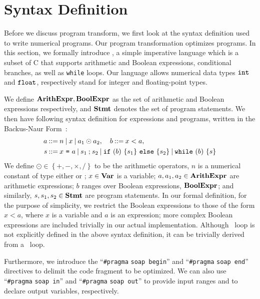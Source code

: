 \section{Syntax Definition}
\label{sec:syntax_definition}

Before we discuss program transform, we first look at the syntax definition
used to write numerical programs.  Our program transformation optimizes
\numimp{} programs.  In this section, we formally introduce \numimp, a simple
imperative language which is a subset of C that supports arithmetic and Boolean
expressions, conditional branches, as well as \texttt{while} loops.  Our
language allows numerical data types $\texttt{int}$ and $\texttt{float}$, respectively
stand for integer and floating-point types.

We define $\mathbf{ArithExpr}, \mathbf{BoolExpr}$ as the set of arithmetic and Boolean
expressions respectively, and $\mathbf{Stmt}$ denotes the set of program statements.
We then have following syntax definition for expressions and \numimp{}
programs, written in the Backus-Naur Form~\cite{knuth64}:
\newcommand{\syndef}{\ensuremath\mathbin{::=}}%
\newcommand{\synor}{\ensuremath\mathbin{\mid}}%
\begin{equation}
    \begin{aligned}
        a \syndef {} &
            n \synor
            x \synor
            a_1 \odot a_2,
        \quad b \syndef x < a, \\
        s \syndef {} &
            x~\texttt{=}~a \synor
            s_1 \semicolon s_2 \synor
            \mathtt{if}~(b)~\{ s_1 \}~\mathtt{else}~\{ s_2 \} \synor
            \whilelit~(b)~\{s\}
    \end{aligned}
    \label{eq:program_syntax}
\end{equation}
We define $\odot \in \left\{ +, -, \times, / \right\}$ to be the arithmetic
operators, $n$ is a numerical constant of type either \inttype{} or \floattype;
$x \in \mathbf{Var}$ is a variable; $a, a_1, a_2 \in \mathbf{ArithExpr}$ are arithmetic
expressions; $b$ ranges over Boolean expressions, $\mathbf{BoolExpr}$; and similarly,
$s, s_1, s_2 \in \mathbf{Stmt}$ are program statements.  In our formal definition,
for the purpose of simplicity, we restrict the Boolean expressions to those
of the form $x < a$, where $x$ is a variable and $a$ is an expression;
more complex Boolean expressions are included trivially in our actual
implementation.  Although \forlit~loop is not explicitly defined in the above
syntax definition, it can be trivially derived from a \whilelit~loop.

Furthermore, we introduce the ``\verb|#pragma| \verb|soap begin|'' and
``\verb|#pragma| \verb|soap end|'' directives to delimit the code fragment
to be optimized.  We can also use ``\verb|#pragma| \verb|soap in|'' and
``\verb|#pragma| \verb|soap out|'' to provide input ranges and to declare
output variables, respectively.

